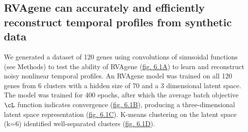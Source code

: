 
\subsection{RVAgene can accurately and efficiently reconstruct temporal profiles from synthetic data}
We generated a dataset of 120 genes using convolutions of sinusoidal functions (see Methods) to test
the ability of RVAgene (\hyperref[fig:fig2]{fig. 6.1A}) to learn and reconstruct noisy nonlinear
temporal profiles. An RVAgene model was trained on all 120 genes from 6 clusters with a hidden size
of 70 and a 3 dimensional latent space. The model was trained for 400 epochs, after which the
average batch objective $\cL$ function indicates convergence (\hyperref[fig:fig2]{fig. 6.1B}),
producing a three-dimensional latent space representation (\hyperref[fig:fig2]{fig. 6.1C}). K-means
clustering on the latent space (k=6) identified well-separated clusters (\hyperref[fig:fig2]{fig. 6.1D}).


